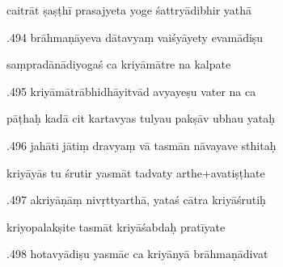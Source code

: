 \documentclass[article,12pt,a4paper]{memoir}%
\newcounter{parCount}
\begin{document}
	  
	  \pstart \leavevmode%
	caitrāt ṣaṣṭhī prasajyeta yoge śattryādibhir yathā 
	{}
	\pend%
      

	  
	  \pstart {}.494 brāhmaṇāyeva dātavyaṃ vaiśyāyety evamādiṣu 
	{}
	\pend%
      

	  
	  \pstart \leavevmode%
	saṃpradānādiyogaś ca kriyāmātre na kalpate 
	{}
	\pend%
      

	  
	  \pstart {}.495 kriyāmātrābhidhāyitvād avyayeṣu vater na ca 
	{}
	\pend%
      

	  
	  \pstart \leavevmode%
	pāṭhaḥ kadā cit kartavyas tulyau pakṣāv ubhau yataḥ 
	{}
	\pend%
      

	  
	  \pstart {}.496 jahāti jātiṃ dravyaṃ vā tasmān nāvayave sthitaḥ 
	{}
	\pend%
      

	  
	  \pstart \leavevmode%
	kriyāyās tu śrutir yasmāt tadvaty arthe+avatiṣṭhate 
	{}
	\pend%
      

	  
	  \pstart {}.497 akriyāṇāṃ nivṛttyarthā, yataś cātra kriyāśrutiḥ 
	{}
	\pend%
      

	  
	  \pstart \leavevmode%
	kriyopalakṣite tasmāt kriyāśabdaḥ pratīyate 
	{}
	\pend%
      

	  
	  \pstart {}.498 hotavyādiṣu yasmāc ca kriyānyā brāhmaṇādivat 
	{}
	\pend%
      
\end{document}
